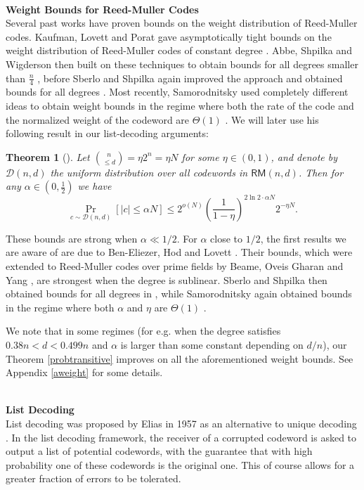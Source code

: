 \documentclass[12pt]{article}
\newtheorem{theorem}{Theorem}
\begin{document}
\hfill\\
\textbf{Weight Bounds for Reed-Muller Codes}
\hfill\\
Several past works have proven bounds on the weight distribution of Reed-Muller codes. Kaufman, Lovett and Porat gave asymptotically tight bounds on the weight distribution of Reed-Muller codes of constant degree \cite{kaufman2012constantdegree}. Abbe, Shpilka and Wigderson then built on these techniques to obtain bounds for all degrees smaller than $\frac{n}{4}$ \cite{abbe2015RMlowrate}, before Sberlo and Shpilka again improved the approach and obtained bounds for all degrees \cite{sberlo2020weightbound}. Most recently, Samorodnitsky used completely different ideas to obtain weight bounds in the regime where both the rate of the code and the normalized weight of the codeword are $\Theta(1)$ \cite{samorodnitsky2020weightboundhalf}. We will later use his following result in our list-decoding arguments:
\begin{theorem}[\cite{samorodnitsky2020weightboundhalf}]\label{previousboundsmall}
Let $\binom{n}{\leq d}=\eta 2^n=\eta N$ for some $\eta\in(0,1)$, and denote by $\mathcal{D}(n,d)$ the uniform distribution over all codewords in $\mathsf{RM}(n,d)$. Then for any $\alpha\in(0, \frac{1}{2})$ we have
$$\Pr_{c\sim \mathcal{D}(n,d)}[|c|\leq \alpha N ]\leq 2^{o(N)}\left(\frac{1}{1-\eta}\right)^{2\ln2 \cdot \alpha N} 2^{-\eta N}.$$
\end{theorem}
These bounds are strong when $\alpha \ll 1/2$. For $\alpha$ close to $1/2$, the first results we are aware of are due to Ben-Eliezer, Hod and Lovett \cite{ben-eliezer2012weighthalf1}. Their bounds, which were extended to Reed-Muller codes over prime fields by Beame, Oveis Gharan and Yang \cite{beame2020weightodd}, are strongest when the degree is sublinear. Sberlo and Shpilka then obtained bounds for all degrees in \cite{sberlo2020weightbound}, while Samorodnitsky again obtained bounds in the regime where both $\alpha$ and $\eta$ are $\Theta(1)$ \cite{samorodnitsky2020weightboundhalf}.

We note that in some regimes (for e.g. when the degree satisfies $0.38n<d<0.499n$ and $\alpha$ is larger than some constant depending on $d/n$), our Theorem \ref{probtransitive} improves on all the aforementioned weight bounds. See Appendix \ref{aweight} for some details.

\hfill\\
\textbf{List Decoding}
\hfill\\
List decoding was proposed by Elias in 1957 as an alternative to unique decoding \cite{elias1957firstlist}. In the list decoding framework, the receiver of a corrupted codeword is asked to output a list of potential codewords, with the guarantee that with high probability one of these codewords is the original one. This of course allows for a greater fraction of errors to be tolerated.
\end{document}
